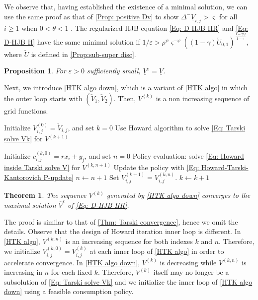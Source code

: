 \documentclass[11pt]{article}
\numberwithin{equation}{section}
\numberwithin{algorithm}{section}
\newtheorem{theorem}{Theorem}[section]
\newtheorem{proposition}[proposition]{Proposition}
\newcommand{\lc}{\left(}
\newcommand{\rc}{\right)}
\newcommand{\eps}{\varepsilon}
\newcommand{\g}{\gamma}
\newcommand{\p}{\psi}
\theoremstyle{plain}
\newcommand{\D}{\Delta}
\begin{document}
We observe that, having established the existence of a minimal solution, we can use the same proof as that of \cref{Prop: positive Dv} to show $\D^-{\underline{V}_{i,j}}>\varsigma$ for all $i\geq1$ when $0<\theta<1$ . The regularized HJB equation \cref{Eq: D-HJB HR} and \cref{Eq: D-HJB H} have the same minimal solution if $1/{\eps}>\rho^{\p}\varsigma^{-\p}\lc(1-\g)\check{U}_{0,1}\rc^{\frac{1-\g \p}{1-\g}}$, where $\check{U}$ is defined in \cref{Prop:sub-super disc}. 
 \begin{proposition}
For $\eps>0$ sufficiently small, $\underline{V}^{\eps}=\underline{V}$. 
 \end{proposition}
 Next, we introduce \cref{HTK algo down}, which is a variant of \cref{HTK algo} in which the outer loop starts with $(\check{V}_1,\check{V}_2)$. Then, $V^{(k)}$ is a non increasing sequence of grid functions. 
 \begin{algorithm}[h!]
\caption{Howard-Tarski-Kantorovich algorithm: downward variant}
\label{HTK algo down}
\begin{algorithmic}[1]
\State 
Initialize $V^{(0)}_{i,j}=\check{V}_{i,j}$, and set $k = 0$ 
\Repeat
\State Use Howard algorithm to solve \cref{Eq: Tarski solve Vk} for $V^{(k+1)}$ 

   \Repeat
   \State Initialize $c^{(k,0)}_{i,j}=rx_i+y_j$, and set $n = 0$ 
   \State Policy evaluation: solve \cref{Eq: Howard inside Tarski solve V} for $V^{(k,n+1)}$
   \State Update the policy with \cref{Eq: Howard-Tarski-Kantorovich P-update}
      \State $n\gets n+1$
 \State Set $V^{(k+1)}_{i,j}=V^{(k,n)}_{i,j}$.
 \State $k\gets k+1$
\end{algorithmic}
\end{algorithm}
\begin{theorem}\label{Thm: Tarski convergence maximal}
The sequence $V^{(k)}$ generated by \cref{HTK algo down} converges to the maximal solution $\overline{V}^{\eps}$ of \cref{Eq: D-HJB HR}. 
\end{theorem}
The proof is similar to that of \cref{Thm: Tarski convergence}, hence we omit the details. Observe that the design of Howard iteration inner loop is different. In \cref{HTK algo}, $V^{(k,n)}$ is an increasing sequence for both indexes $k$ and $n$. Therefore, we initialize $V^{(k,0)}_{i,j}=V^{(k)}_{i,j}$ at each inner loop of \cref{HTK algo} in order to accelerate convergence. In \cref{HTK algo down}, $V^{(k)}$ is decreasing while $V^{(k,n)}$ is increasing in $n$ for each fixed $k$. Therefore, $V^{(k)}$ itself may no longer be a subsolution of \cref{Eq: Tarski solve Vk} and we initialize the inner loop of \cref{HTK algo down} using a feasible consumption policy. \par
\end{document}
